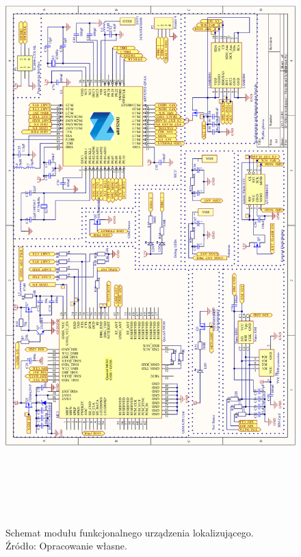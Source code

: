 \begin{figure}[H]
	\centering
	\includegraphics[width=16cm, height=23cm]{img/schematics/mainboard_fixed.png}
	\caption{Schemat modułu funkcjonalnego urządzenia lokalizującego. \\ Źródło: Opracowanie własne.}
	\label{fig:image_mainboard_functional_schematic}
\end{figure}

